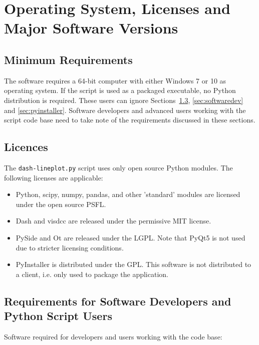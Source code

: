 \chapter{Operating System, Licenses and Major Software Versions}


\section{Minimum Requirements}
\label{sec:minReq}

The software requires a 64-bit computer with either Windows 7 or 10 as operating system. If the script is used as a packaged executable, no Python distribution is required. These users can ignore Sections~\ref{sec:requirements},  \ref{sec:softwaredev} and \ref{sec:pyinstaller}.
Software developers and advanced users working with the script code base need to take note of the requirements discussed in these sections.


\section{Licences}
\label{sec:licenses}

The \texttt{dash-lineplot.py} script uses only open source Python modules. The following licenses are applicable:

\begin{itemize}

  \item Python, scipy, numpy, pandas, and other 'standard' modules are licensed under the open source \ac{PSFL}.
  \item Dash and visdcc are released under the permissive \ac{MIT} license.
  \item PySide and Ot are released under the \ac{LGPL}. Note that PyQt5 is not used due to stricter licensing conditions.
  \item PyInstaller is distributed under the \ac{GPL}. This software is not distributed to a client, i.e. only used to package the application.
\end{itemize}

\section{Requirements for Software Developers and Python Script Users}
\label{sec:requirements}

Software required for developers and users working with the code base:

